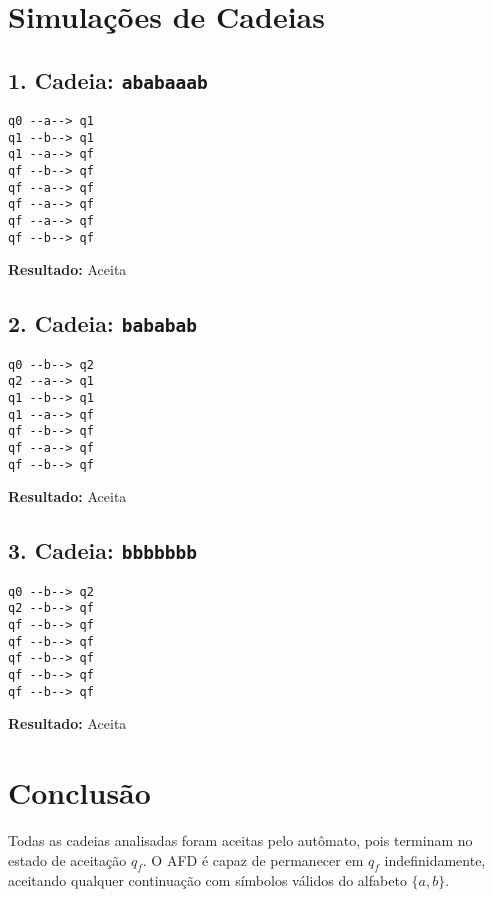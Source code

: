 \documentclass[12pt]{article}
\begin{document}
\section*{Simulações de Cadeias}

\subsection*{1. Cadeia: \texttt{ababaaab}}

\begin{lstlisting}
q0 --a--> q1
q1 --b--> q1
q1 --a--> qf
qf --b--> qf
qf --a--> qf
qf --a--> qf
qf --a--> qf
qf --b--> qf
\end{lstlisting}

\textbf{Resultado:} Aceita

\subsection*{2. Cadeia: \texttt{bababab}}

\begin{lstlisting}
q0 --b--> q2
q2 --a--> q1
q1 --b--> q1
q1 --a--> qf
qf --b--> qf
qf --a--> qf
qf --b--> qf
\end{lstlisting}

\textbf{Resultado:} Aceita 

\subsection*{3. Cadeia: \texttt{bbbbbbb}}

\begin{lstlisting}
q0 --b--> q2
q2 --b--> qf
qf --b--> qf
qf --b--> qf
qf --b--> qf
qf --b--> qf
qf --b--> qf
\end{lstlisting}

\textbf{Resultado:} Aceita 

\section*{Conclusão}

Todas as cadeias analisadas foram aceitas pelo autômato, pois terminam no estado de aceitação $q_f$. O AFD é capaz de permanecer em $q_f$ indefinidamente, aceitando qualquer continuação com símbolos válidos do alfabeto $\{a, b\}$.
\end{document}
